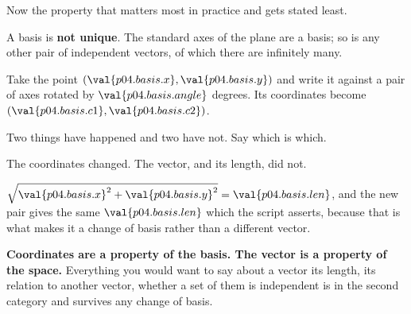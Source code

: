 \begin{fr}
Now the property that matters most in practice and gets stated least.

A basis is \textbf{not unique}. The standard axes of the plane are a basis; so
is any other pair of independent vectors, of which there are infinitely many.

Take the point $(\val{p04.basis.x}, \val{p04.basis.y})$ and write it against a
pair of axes rotated by $\val{p04.basis.angle}$ degrees. Its coordinates become
$(\val{p04.basis.c1}, \val{p04.basis.c2})$.

Two things have happened and two have not. Say which is which.
\nextframe
\end{fr}

\begin{fr}
\begin{ansblock}
The coordinates changed. The vector, and its length, did not.
\end{ansblock}

$\sqrt{\val{p04.basis.x}^{2} + \val{p04.basis.y}^{2}} = \val{p04.basis.len}$,
and the new pair gives the same $\val{p04.basis.len}$ \dash{} which the script
asserts, because that is what makes it a change of basis rather than a
different vector.

\textbf{Coordinates are a property of the basis. The vector is a property of the
space.} Everything you would want to say about a vector \dash{} its length, its
relation to another vector, whether a set of them is independent \dash{} is in
the second category and survives any change of basis.
\end{fr}



